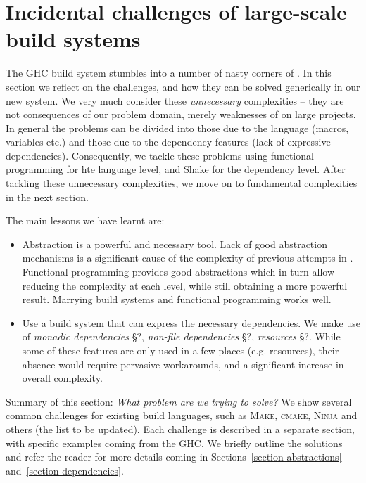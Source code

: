 
\section{Incidental challenges of large-scale build systems}

The GHC build system stumbles into a number of nasty corners of \make. In this section we reflect on the challenges, and how they can be solved generically in our new system. We very much consider these \textit{unnecessary} complexities -- they are not consequences of our problem domain, merely weaknesses of \make on large projects. In general the problems can be divided into those due to the \make language (macros, variables etc.) and those due to the \make dependency features (lack of expressive dependencies). Consequently, we tackle these problems using functional programming for hte language level, and Shake for the dependency level. After tackling these unnecessary complexities, we move on to fundamental complexities in the next section.

The main lessons we have learnt are:

\begin{itemize}
\item Abstraction is a powerful and necessary tool. Lack of good abstraction mechanisms is a significant cause of the complexity of previous attempts in \make. Functional programming provides good abstractions which in turn allow reducing the complexity at each level, while still obtaining a more powerful result. Marrying build systems and functional programming works well.
\item Use a build system that can express the necessary dependencies. We make use of \textit{monadic dependencies} \S?, \textit{non-file dependencies} \S?, \textit{resources} \S?. While some of these features are only used in a few places (e.g. resources), their absence would require pervasive workarounds, and a significant increase in overall complexity.
\end{itemize}


Summary of this section: \emph{What problem are we trying to solve?} We show several
common challenges for existing build languages, such as \textsc{Make},
\textsc{cmake}, \textsc{Ninja} and others (the list to be updated). Each
challenge is described in a separate section, with specific examples coming from
the GHC. We briefly outline the solutions and refer the reader for more details
coming in Sections~\ref{section-abstractions} and~\ref{section-dependencies}.

